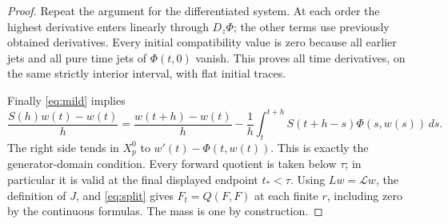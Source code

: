 \documentclass[11pt,a4paper]{article}
\numberwithin{equation}{section}
\theoremstyle{remark}
\newcommand{\calL}{\mathcal L}
\newcommand{\dd}{\,d}
\begin{document}
\begin{proof}
Repeat the argument for the differentiated system. At each order the
highest derivative enters linearly through \(D_z\Phi\); the other terms
use previously obtained derivatives. Every initial compatibility value
is zero because all earlier jets and all pure time jets of
\(\Phi(t,0)\) vanish. This proves all time derivatives, on the same
strictly interior interval, with flat initial traces.

Finally \eqref{eq:mild} implies
\[
 \frac{S(h)w(t)-w(t)}h
 =\frac{w(t+h)-w(t)}h
  -\frac1h\int_t^{t+h}S(t+h-s)\Phi(s,w(s))\dd s.
\]
The right side tends in \(X_p^0\) to \(w'(t)-\Phi(t,w(t))\).
This is exactly the generator-domain condition. Every forward quotient
is taken below \(\tau\); in particular it is valid at the final
displayed endpoint \(t_*<\tau\).
Using \(Lw=\calL w\), the definition of \(J\), and
\eqref{eq:split} gives \(F_t=Q(F,F)\) at each finite \(r\), including
zero by the continuous formulas. The mass is one by construction.
\end{proof}
\end{document}
